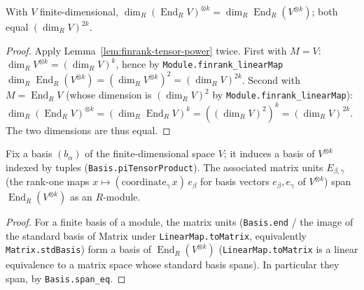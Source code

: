 \begin{lemma}
    \label{lem:finrank-end-tensor}
    \leanok
    With $V$ finite-dimensional,
    $\dim_R (\operatorname{End}_R V)^{\otimes k} = \dim_R \operatorname{End}_R(V^{\otimes k})$; both equal
    $(\dim_R V)^{2k}$.
\end{lemma}
\begin{proof}
    Apply Lemma~\ref{lem:finrank-tensor-power} twice. First with $M = V$:
    $\dim_R V^{\otimes k} = (\dim_R V)^k$, hence by \texttt{Module.finrank\_linearMap}
    $\dim_R \operatorname{End}_R(V^{\otimes k}) = (\dim_R V^{\otimes k})^2 = (\dim_R V)^{2k}$. Second with
    $M = \operatorname{End}_R V$ (whose dimension is $(\dim_R V)^2$ by \texttt{Module.finrank\_linearMap}):
    $\dim_R (\operatorname{End}_R V)^{\otimes k} = (\dim_R \operatorname{End}_R V)^k = ((\dim_R V)^2)^k =
    (\dim_R V)^{2k}$. The two dimensions are thus equal.
\end{proof}

\begin{lemma}
    \label{lem:matrix-units-span-end}
    Fix a basis $(b_\alpha)$ of the finite-dimensional space $V$; it induces a basis of $V^{\otimes k}$
    indexed by tuples (\texttt{Basis.piTensorProduct}). The associated matrix units
    $E_{\beta,\gamma}$ (the rank-one maps $x \mapsto (\text{coordinate}_\gamma\,x)\, e_\beta$ for basis
    vectors $e_\beta, e_\gamma$ of $V^{\otimes k}$) span $\operatorname{End}_R(V^{\otimes k})$ as an
    $R$-module.
\end{lemma}
\begin{proof}
    For a finite basis of a module, the matrix units (\texttt{Basis.end} / the image of the standard basis
    of $\mathrm{Matrix}$ under \texttt{LinearMap.toMatrix}, equivalently \texttt{Matrix.stdBasis})
    form a basis of $\operatorname{End}_R(V^{\otimes k})$ (\texttt{LinearMap.toMatrix} is a linear
    equivalence to a matrix space whose standard basis spans). In particular they span, by
    \texttt{Basis.span\_eq}.
\end{proof}

